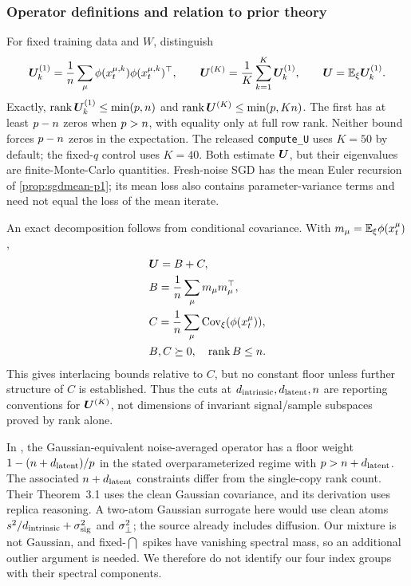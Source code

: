 \subsubsection{Operator definitions and relation to prior theory}\label{app:operator-crosswalk}
For fixed training data and $W$, distinguish
\[
\bm{U}^{(1)}_k=\frac1{n}\sum_\mu\phi(x_t^{\mu,k})\phi(x_t^{\mu,k})^\top,\qquad
\bm{U}^{(K)}=\frac1K\sum_{k=1}^K\bm{U}^{(1)}_k,\qquad
\bm{U}=\mathbb{E}_\xi\bm{U}^{(1)}_k.
\]
Exactly, $\operatorname{rank}\bm{U}^{(1)}_k\le\min(p,n)$ and $\operatorname{rank}\bm{U}^{(K)}\le\min(p,Kn)$. The first has at least $p-n$ zeros when $p>n$, with equality only at full row rank. Neither bound forces $p-n$ zeros in the expectation. The released \texttt{compute\_U} uses $K=50$ by default; the fixed-$q$ control uses $K=40$. Both estimate $\bm{U}$, but their eigenvalues are finite-Monte-Carlo quantities. Fresh-noise SGD has the mean Euler recursion of \cref{prop:sgdmean-p1}; its mean loss also contains parameter-variance terms and need not equal the loss of the mean iterate.

An exact decomposition follows from conditional covariance. With $m_\mu=\mathbb{E}_\xi\phi(x_t^\mu)$,
\begin{equation}\label{eq:conditional-U}
\begin{aligned}
&\bm{U}=B+C,\\ & B=\frac1{n}\sum_\mu m_\mu m_\mu^\top,\\ & C=\frac1{n}\sum_\mu\operatorname{Cov}_\xi(\phi(x_t^\mu)),\\ & B,C\succeq0,\quad\operatorname{rank}B\le n.
\end{aligned}
\end{equation}
This gives interlacing bounds relative to $C$, but no constant floor unless further structure of $C$ is established. Thus the cuts at $d_{\mathrm{intrinsic}},d_{\mathrm{latent}},n$ are reporting conventions for $\bm{U}^{(K)}$, not dimensions of invariant signal/sample subspaces proved by rank alone.

In \citet[Theorem~3.2 and Appendix~C.5]{bonnaire2025}, the Gaussian-equivalent noise-averaged operator has a floor weight $1-(n+d_{\mathrm{latent}})/p$ in the stated overparameterized regime with $p>n+d_{\mathrm{latent}}$. The associated $n+d_{\mathrm{latent}}$ constraints differ from the single-copy rank count. Their Theorem~3.1 uses the clean Gaussian covariance, and its derivation uses replica reasoning. A two-atom Gaussian surrogate here would use clean atoms $s^2/d_{\mathrm{intrinsic}}+\sigma_{\mathrm{sig}}^2$ and $\sigma_{\perp}^2$; the source already includes diffusion. Our mixture is not Gaussian, and fixed-$\dint$ spikes have vanishing spectral mass, so an additional outlier argument is needed. We therefore do not identify our four index groups with their spectral components.

